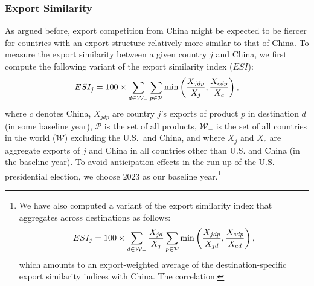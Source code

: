 \documentclass[english,12pt]{article}
\theoremstyle{definition}
\begin{document}
\subsubsection{Export Similarity}

As argued before, export competition from China might be expected 
to be fiercer for countries with an export structure relatively more similar 
to that of China. To measure the export similarity between a given country $j$ and
China, we first compute the following variant of the \cite%
{FingerKreinin1979ExportSimilarity} export similarity index ($ESI$):%
\begin{equation}
ESI_{j}= 100 \times \sum_{d\in \mathcal{W}_{-}}\sum_{p\in \mathcal{P}}\min \left( \frac{%
X_{jdp}}{X_{j}},\frac{X_{cdp}}{X_{c}}\right) ,
\label{eq: ESI Formula}
\end{equation}%
where $c$ denotes China, $X_{jdp}$ are country $j$'s exports of product $p$
in destination $d$ (in some baseline year), $\mathcal{P}$ is the set of all
products, $\mathcal{W}_{-}$ is the set of all countries in the world ($%
\mathcal{W}$) excluding the U.S.\ and China, and where $X_{j}$ and $X_{c}$
are aggregate exports of $j$ and China in all countries other than U.S. and
China (in the baseline year). To avoid anticipation effects in the run-up of
the U.S. presidential election, we choose 2023 as our baseline year.\footnote{
We have also computed a variant of the export similarity index that 
aggregates across destinations as follows:
\begin{equation}
ESI_{j}= 100 \times \sum_{d\in \mathcal{W}_{-}}\frac{%
X_{jd}}{X_{j}}\sum_{p\in \mathcal{P}}\min \left( \frac{%
X_{jdp}}{X_{jd}},\frac{X_{cdp}}{X_{cd}}\right) ,
\end{equation}
which amounts to an export-weighted average of the destination-specific
export similarity indices with China. The correlation.}
\end{document}
